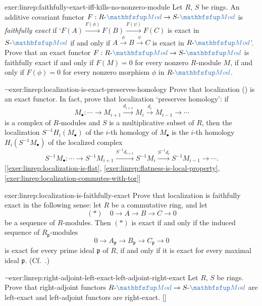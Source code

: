 \begin{exer}{}{exer:linrep:faithfully-exact-iff-kills-no-nonzero-module}
  Let $R$, $S$ be rings. An additive covariant functor
  $F : R\text{-}\categ{Mod} \to S\text{-}\categ{Mod}$ is
  \emph{faithfully exact} if
  `$F(A) \xrightarrow{F(\phi)} F(B) \xrightarrow{F(\psi)} F(C)$ is
  exact in $S\text{-}\categ{Mod}$ if and only if
  $A \xrightarrow{\phi} B \xrightarrow{\psi} C$ is exact in
  $R\text{-}\categ{Mod}$'. Prove that an exact functor
  $F : R\text{-}\categ{Mod} \to S\text{-}\categ{Mod}$ is faithfully
  exact if and only if $F(M) = 0$ for every nonzero $R$-module $M$, if
  and only if $F(\phi) = 0$ for every nonzero morphism $\phi$ in
  $R\text{-}\categ{Mod}$.
\end{exer}

\begin{exer}{$\lnot$}{exer:linrep:localization-is-exact-preserves-homology}
  Prove that localization
  () is an exact
  functor. In fact, prove that localization `preserves homology': if
  \[
    M_\bullet : \cdots \to M_{i+1} \xrightarrow{d_{i+1}} M_i
    \xrightarrow{d_i} M_{i-1} \to \cdots
  \]
  is a complex of $R$-modules and $S$ is a multiplicative subset of
  $R$, then the localization $S^{-1}H_i(M_\bullet)$ of the $i$-th
  homology of $M_\bullet$ is the $i$-th homology
  $H_i(S^{-1}M_\bullet)$ of the localized complex
  \[
    S^{-1}M_\bullet : \cdots \to S^{-1}M_{i+1}
    \xrightarrow{S^{-1}d_{i+1}} S^{-1}M_i \xrightarrow{S^{-1}d_i}
    S^{-1}M_{i-1} \to \cdots.
  \] [\ref{exer:linrep:localization-is-flat},
  \ref{exer:linrep:flatness-is-local-property},
  \ref{exer:linrep:localization-commutes-with-tor}]
\end{exer}

\begin{exer}{}{exer:linrep:localization-is-faithfully-exact}
  Prove that localization is faithfully exact in the following sense:
  let $R$ be a commutative ring, and let
  \[
    (\ast)\quad 0 \to A \to B \to C \to 0
  \]
  be a sequence of $R$-modules. Then $(\ast)$ is exact if and only if
  the induced sequence of $R_{\mathfrak{p}}$-modules
  \[
    0 \to A_{\mathfrak{p}} \to B_{\mathfrak{p}} \to C_{\mathfrak{p}}
    \to 0
  \]
  is exact for every prime ideal $\mathfrak{p}$ of $R$, if and only if
  it is exact for every maximal ideal $\mathfrak{p}$.  (Cf.\
  .)
\end{exer}

\begin{exer}{$\lnot$}{exer:linrep:right-adjoint-left-exact-left-adjoint-right-exact}
  Let $R$, $S$ be rings. Prove that right-adjoint functors
  $R\text{-}\categ{Mod} \to S\text{-}\categ{Mod}$ are left-exact and
  left-adjoint functors are
  right-exact. []
\end{exer}

